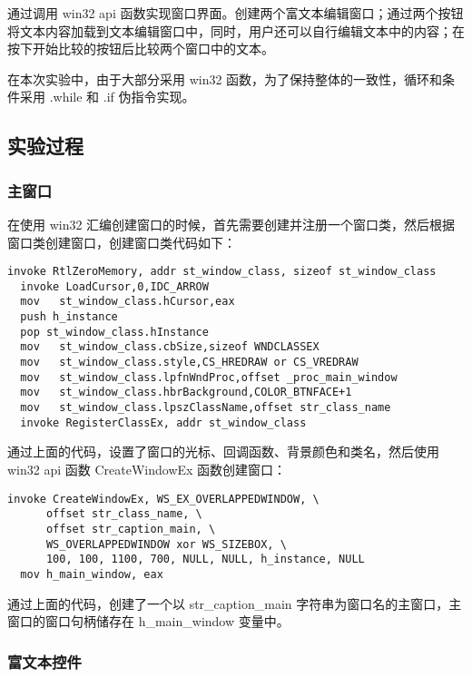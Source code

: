 \documentclass[proposal-report]{bitart}
\begin{document}
通过调用 win32 api 函数实现窗口界面。创建两个富文本编辑窗口；通过两个按钮将文本内容加载到文本编辑窗口中，同时，用户还可以自行编辑文本中的内容；在按下开始比较的按钮后比较两个窗口中的文本。

在本次实验中，由于大部分采用 win32 函数，为了保持整体的一致性，循环和条件采用 .while 和 .if 伪指令实现。

\subsection{实验过程}

\subsubsection{主窗口}

在使用 win32 汇编创建窗口的时候，首先需要创建并注册一个窗口类，然后根据窗口类创建窗口，创建窗口类代码如下：

\begin{lstlisting}[language={[x86masm]Assembler}]
  invoke RtlZeroMemory, addr st_window_class, sizeof st_window_class
  invoke LoadCursor,0,IDC_ARROW
  mov	st_window_class.hCursor,eax
  push h_instance
  pop st_window_class.hInstance
  mov	st_window_class.cbSize,sizeof WNDCLASSEX
  mov	st_window_class.style,CS_HREDRAW or CS_VREDRAW
  mov	st_window_class.lpfnWndProc,offset _proc_main_window
  mov	st_window_class.hbrBackground,COLOR_BTNFACE+1
  mov	st_window_class.lpszClassName,offset str_class_name
  invoke RegisterClassEx, addr st_window_class
\end{lstlisting}

通过上面的代码，设置了窗口的光标、回调函数、背景颜色和类名，然后使用 win32 api 函数 CreateWindowEx 函数创建窗口：

\begin{lstlisting}[language={[x86masm]Assembler}]
  invoke CreateWindowEx, WS_EX_OVERLAPPEDWINDOW, \
      offset str_class_name, \
      offset str_caption_main, \
      WS_OVERLAPPEDWINDOW xor WS_SIZEBOX, \
      100, 100, 1100, 700, NULL, NULL, h_instance, NULL
  mov h_main_window, eax
\end{lstlisting}

通过上面的代码，创建了一个以 str\_caption\_main 字符串为窗口名的主窗口，主窗口的窗口句柄储存在 h\_main\_window 变量中。

\subsubsection{富文本控件}
\end{document}
